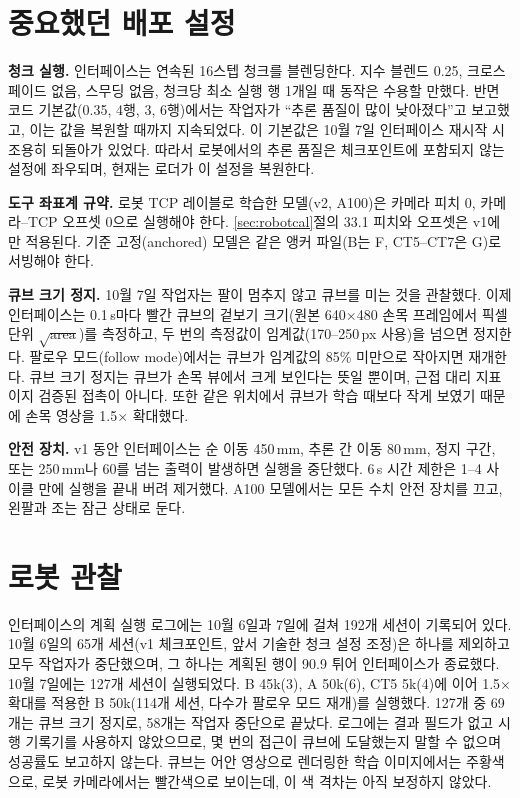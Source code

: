 \documentclass[conference,10pt]{IEEEtran}
\newcommand{\mm}{\,mm\xspace}
\begin{document}
\section{중요했던 배포 설정}\label{sec:deploy}
\textbf{청크 실행.} 인터페이스는 연속된 16스텝 청크를 블렌딩한다. 지수 블렌드 0.25, 크로스페이드 없음, 스무딩 없음,
청크당 최소 실행 행 1개일 때 동작은 수용할 만했다. 반면 코드 기본값(0.35, 4행, 3\textdegree, 6행)에서는 작업자가
“추론 품질이 많이 낮아졌다”고 보고했고, 이는 값을 복원할 때까지 지속되었다. 이 기본값은 10월 7일 인터페이스 재시작 시
조용히 되돌아가 있었다. 따라서 로봇에서의 추론 품질은 체크포인트에 포함되지 않는 설정에 좌우되며, 현재는 로더가 이
설정을 복원한다.

\textbf{도구 좌표계 규약.} 로봇 TCP 레이블로 학습한 모델(v2, A100)은 카메라 피치 0, 카메라--TCP 오프셋 0으로 실행해야 한다.
\ref{sec:robotcal}절의 33.1\textdegree{} 피치와 오프셋은 v1에만 적용된다. 기준 고정(anchored) 모델은 같은 앵커 파일(B는
F, CT5--CT7은 G)로 서빙해야 한다.

\textbf{큐브 크기 정지.} 10월 7일 작업자는 팔이 멈추지 않고 큐브를 미는 것을 관찰했다. 이제 인터페이스는 0.1\,s마다 빨간
큐브의 겉보기 크기(원본 640$\times$480 손목 프레임에서 픽셀 단위 $\sqrt{\text{area}}$)를 측정하고, 두 번의 측정값이
임계값(170--250\,px 사용)을 넘으면 정지한다. 팔로우 모드(follow mode)에서는 큐브가 임계값의 85\% 미만으로 작아지면 재개한다.
큐브 크기 정지는 큐브가 손목 뷰에서 크게 보인다는 뜻일 뿐이며, 근접 대리 지표이지 검증된 접촉이 아니다. 또한 같은 위치에서
큐브가 학습 때보다 작게 보였기 때문에 손목 영상을 1.5$\times$ 확대했다.

\textbf{안전 장치.} v1 동안 인터페이스는 순 이동 450\mm, 추론 간 이동 80\mm, 정지 구간, 또는 250\mm{}나
60\textdegree{}를 넘는 출력이 발생하면 실행을 중단했다. 6\,s 시간 제한은 1--4 사이클 만에 실행을 끝내 버려 제거했다.
A100 모델에서는 모든 수치 안전 장치를 끄고, 왼팔과 조는 잠근 상태로 둔다.

\section{로봇 관찰}\label{sec:robot}
인터페이스의 계획 실행 로그에는 10월 6일과 7일에 걸쳐 192개 세션이 기록되어 있다. 10월 6일의 65개 세션(v1 체크포인트,
앞서 기술한 청크 설정 조정)은 하나를 제외하고 모두 작업자가 중단했으며, 그 하나는 계획된 행이 90.9\textdegree{} 튀어
인터페이스가 종료했다. 10월 7일에는 127개 세션이 실행되었다. B 45k(3), A 50k(6), CT5 5k(4)에 이어 1.5$\times$ 확대를
적용한 B 50k(114개 세션, 다수가 팔로우 모드 재개)를 실행했다. 127개 중 69개는 큐브 크기 정지로, 58개는 작업자 중단으로
끝났다. 로그에는 결과 필드가 없고 시행 기록기를 사용하지 않았으므로, 몇 번의 접근이 큐브에 도달했는지 말할 수 없으며
성공률도 보고하지 않는다. 큐브는 어안 영상으로 렌더링한 학습 이미지에서는 주황색으로, 로봇 카메라에서는 빨간색으로 보이는데,
이 색 격차는 아직 보정하지 않았다.
\end{document}
